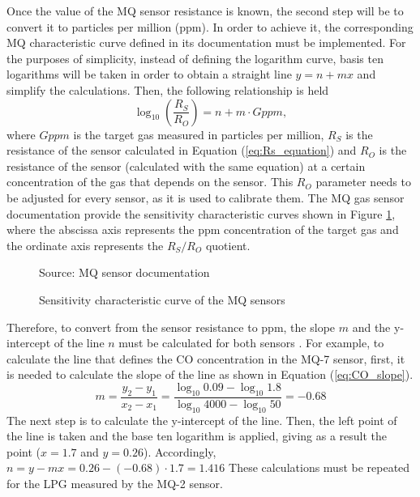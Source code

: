 Once the value of the MQ sensor resistance is known, the second step will be to convert it to particles per million (ppm). In order to achieve it, the corresponding MQ characteristic curve defined in its documentation must be implemented. For the purposes of simplicity, instead of defining the logarithm curve, basis ten logarithms will be taken in order to obtain a straight line $y=n+mx$ and simplify the calculations. Then, the following relationship is held
\begin{equation*} \label{eq:ppm_equation}
\log _{ 10 }{ \left( \frac{{R}_{S}}{{R}_{O}} \right)} =n+m\cdot Gppm,
\end{equation*}
where $Gppm$ is the target gas measured in particles per million, ${R}_{S}$ is the resistance of the sensor calculated in Equation (\ref{eq:Rs_equation}) and ${R}_{O}$ is the resistance of the sensor (calculated with the same equation) at a certain concentration of the gas that depends on the sensor. This ${R}_{O}$ parameter needs to be adjusted for every sensor, as it is used to calibrate them. The MQ gas sensor documentation provide the sensitivity characteristic curves shown in Figure \ref{fig:6-MQ_curve}, where the abscissa axis represents the ppm concentration of the target gas and the ordinate axis represents the ${R}_{S}/{R}_{O}$ quotient.

\begin{figure}[htb]
	\centering
	\caption{Sensitivity characteristic curve of the MQ sensors}
	\label{fig:6-MQ_curve}{Source: MQ sensor documentation \cite{MQ2,MQ7}}
\end{figure}

Therefore, to convert from the sensor resistance to ppm, the slope $m$ and the y-intercept of the line $n$ must be calculated for both sensors \cite{ConfMQX}. For example, to calculate the line that defines the CO concentration in the MQ-7 sensor, first, it is needed to calculate the slope of the line as shown in Equation (\ref{eq:CO_slope}).
\begin{equation} \label{eq:CO_slope}
m=\frac { { y }_{ 2 }-{ y }_{ 1 } }{ { x }_{ 2 }-{ x }_{ 1 } } =\frac { \log _{ 10 }{ 0.09 } -\log _{ 10 }{ 1.8 }  }{ \log _{ 10 }{ 4000 } -\log _{ 10 }{ 50 }  } =-0.68
\end{equation}
The next step is to calculate the y-intercept of the line. Then, the left point of the line is taken and the base ten logarithm is applied, giving as a result the point ($x=1.7$ and $y=0.26$). Accordingly, $n = y - mx =  0.26 - (-0.68)\cdot1.7 = 1.416$ These calculations must be repeated for the LPG measured by the MQ-2 sensor.

